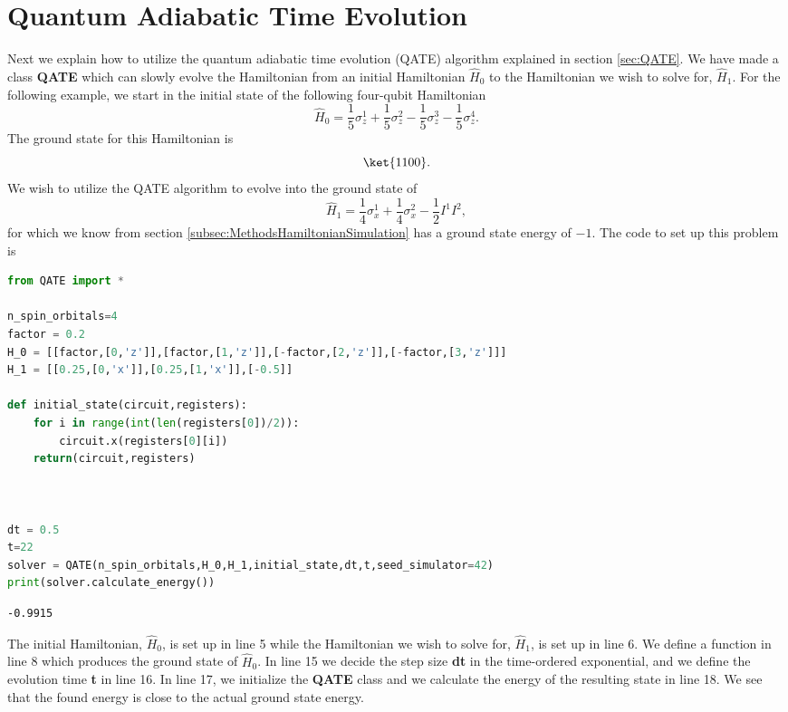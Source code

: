 \section{Quantum Adiabatic Time Evolution}
\label{sec:MethodsQATE}
Next we explain how to utilize the quantum adiabatic time evolution (QATE) algorithm explained in section \ref{sec:QATE}. We have made a class \textbf{QATE} which can slowly evolve the Hamiltonian from an initial Hamiltonian $\hat{H}_0$ to the Hamiltonian we wish to solve for, $\hat{H}_1$. For the following example, we start in the initial state of the following four-qubit Hamiltonian
$$\hat{H}_0 = \frac{1}{5} \sigma_z^1 + \frac{1}{5} \sigma_z^2 - \frac{1}{5} \sigma_z^3 - \frac{1}{5} \sigma_z^4. $$
The ground state for this Hamiltonian is
$$ \ket{1100}. $$
We wish to utilize the QATE algorithm to evolve into the ground state of 
$$\hat{H}_1 = \frac{1}{4} \sigma_x^1 + \frac{1}{4} \sigma_x^2 - \frac{1}{2}I^1 I^2,$$
for which we know from section \ref{subsec:MethodsHamiltonianSimulation} has a ground state energy of $-1$. The code to set up this problem is
\begin{lstlisting}[language=Python]
from QATE import *

n_spin_orbitals=4
factor = 0.2
H_0 = [[factor,[0,'z']],[factor,[1,'z']],[-factor,[2,'z']],[-factor,[3,'z']]]
H_1 = [[0.25,[0,'x']],[0.25,[1,'x']],[-0.5]]

def initial_state(circuit,registers):
	for i in range(int(len(registers[0])/2)):
		circuit.x(registers[0][i])
	return(circuit,registers)



dt = 0.5
t=22
solver = QATE(n_spin_orbitals,H_0,H_1,initial_state,dt,t,seed_simulator=42)
print(solver.calculate_energy())
\end{lstlisting}

\begin{verbatim}
-0.9915
\end{verbatim}
The initial Hamiltonian, $\hat{H}_0$, is set up in line 5 while the Hamiltonian we wish to solve for, $\hat{H}_1$, is set up in line 6. We define a function in line 8 which produces the ground state of $\hat{H}_0$. In line 15 we decide the step size \textbf{dt} in the time-ordered exponential, and we define the evolution time \textbf{t} in line 16. In line 17, we initialize the \textbf{QATE} class and we calculate the energy of the resulting state in line 18. We see that the found energy is close to the actual ground state energy.

